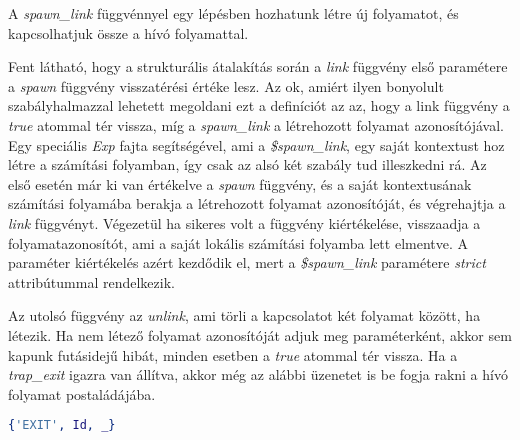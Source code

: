 A \textit{spawn\_link} függvénnyel egy lépésben hozhatunk létre új folyamatot, és kapcsolhatjuk össze a hívó folyamattal.



Fent látható, hogy a strukturális átalakítás során a \textit{link} függvény első paramétere a \textit{spawn} függvény visszatérési értéke lesz. Az ok, amiért ilyen bonyolult szabályhalmazzal lehetett megoldani ezt a definíciót az az, hogy a link függvény a \textit{true} atommal tér vissza, míg a \textit{spawn\_link} a létrehozott folyamat azonosítójával. Egy speciális \textit{Exp} fajta segítségével, ami a \textit{\$spawn\_link}, egy saját kontextust hoz létre a számítási folyamban, így csak az alsó két szabály tud illeszkedni rá. Az első esetén már ki van értékelve a \textit{spawn} függvény, és a saját kontextusának számítási folyamába berakja a létrehozott folyamat azonosítóját, és végrehajtja a \textit{link} függvényt. Végezetül ha sikeres volt a függvény kiértékelése, visszaadja a folyamatazonosítót, ami a saját lokális számítási folyamba lett elmentve. A paraméter kiértékelés azért kezdődik el, mert a \textit{\$spawn\_link} paramétere \textit{strict} attribútummal rendelkezik.

Az utolsó függvény az \textit{unlink}, ami törli a kapcsolatot két folyamat között, ha létezik. Ha nem létező folyamat azonosítóját adjuk meg paraméterként, akkor sem kapunk futásidejű hibát, minden esetben a \textit{true} atommal tér vissza. Ha a \textit{trap\_exit} igazra van állítva, akkor még az alábbi üzenetet is be fogja rakni a hívó folyamat postaládájába.

\begin{lstlisting}[language=Erlang]
{'EXIT', Id, _}
\end{lstlisting}







